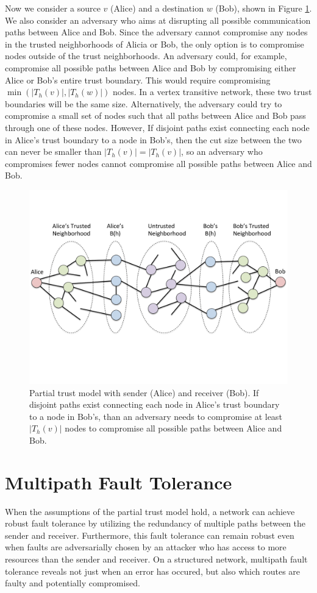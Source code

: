 \documentclass[prodmode,permissions]{acmsmall-ec16}
\begin{document}
Now we consider a source $v$ (Alice) and a destination $w$ (Bob),
shown in Figure \ref{fig:trust-source-destionation}. We also consider an adversary who aims at disrupting all possible communication paths between Alice and Bob. Since the adversary cannot compromise any nodes in the trusted neighborhoods of Alicia or Bob, the only option is to compromise nodes outside of the trust neighborhoods. An adversary could, for example, compromise all possible paths between Alice and Bob by compromising either Alice or Bob's entire trust boundary. This would require compromising $\min(|T_h(v)|, |T_h(w)|)$ nodes. In a vertex transitive network, these two trust boundaries will be the same size. Alternatively, the adversary could try to compromise a small set of nodes such that all paths between Alice and Bob pass through one of these nodes. However, If disjoint paths exist connecting each node in Alice's trust boundary to
a node in Bob's, then the cut size between the two can never be smaller than
$|T_h(v)| = |T_h(v)|$, so an adversary who compromises fewer nodes cannot compromise all possible paths between Alice and Bob.

\begin{figure}
\centerline{\includegraphics[height =.4 \textwidth]{fig-bob_Alice_trusted_neigh2}}
\caption{
Partial trust model with sender (Alice) and receiver (Bob).
If disjoint paths exist connecting each node in Alice's trust boundary to
a node in Bob's,
than an adversary needs to compromise at least $|T_h(v)|$ nodes to
compromise all possible paths between Alice and Bob.
}
\label{fig:trust-source-destionation}
\end{figure}

\section{Multipath Fault Tolerance}

When the assumptions of the partial trust model hold, a network can achieve
robust fault tolerance by utilizing the redundancy of multiple paths
between the sender and receiver.
Furthermore, this fault tolerance can remain robust even when faults are
adversarially chosen by an attacker who has access to more resources
than the sender and receiver.
On a structured network, multipath fault tolerance reveals not just when
an error has occured, but also which routes are faulty and potentially
compromised.
\end{document}
